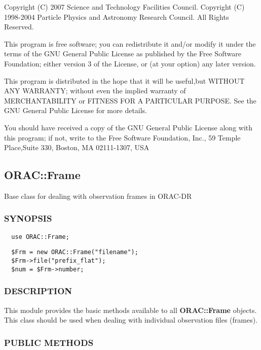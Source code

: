 \begin{description}
Copyright (C) 2007 Science and Technology Facilities Council.
Copyright (C) 1998-2004 Particle Physics and Astronomy Research
Council. All Rights Reserved.



This program is free software; you can redistribute it and/or modify it under
the terms of the GNU General Public License as published by the Free Software
Foundation; either version 3 of the License, or (at your option) any later
version.



This program is distributed in the hope that it will be useful,but WITHOUT ANY
WARRANTY; without even the implied warranty of MERCHANTABILITY or FITNESS FOR A
PARTICULAR PURPOSE. See the GNU General Public License for more details.



You should have received a copy of the GNU General Public License along with
this program; if not, write to the Free Software Foundation, Inc., 59 Temple
Place,Suite 330, Boston, MA  02111-1307, USA

\subsection{ORAC::Frame\label{ORAC::Frame}}


Base class for dealing with observation frames in ORAC-DR

\subsubsection*{SYNOPSIS\label{ORAC::Frame_SYNOPSIS}}
\begin{verbatim}
  use ORAC::Frame;
\end{verbatim}
\begin{verbatim}
  $Frm = new ORAC::Frame("filename");
  $Frm->file("prefix_flat");
  $num = $Frm->number;
\end{verbatim}
\subsubsection*{DESCRIPTION\label{ORAC::Frame_DESCRIPTION}}


This module provides the basic methods available to all \textbf{ORAC::Frame}
objects. This class should be used when dealing with individual
observation files (frames).

\subsubsection*{PUBLIC METHODS\label{ORAC::Frame_PUBLIC_METHODS}}



\end{description}
